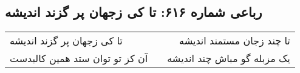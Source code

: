 \begin{center}
\section*{رباعی شماره ۶۱۶: تا کی زجهان پر گزند اندیشه}
\label{sec:sh616}
\begin{longtable}{l p{0.5cm} r}
تا کی زجهان پر گزند اندیشه
&&
تا چند زجان مستمند اندیشه
\\
آن کز تو توان ستد همین کالبدست
&&
یک مزبله گو مباش چند اندیشه
\\
\end{longtable}
\end{center}
